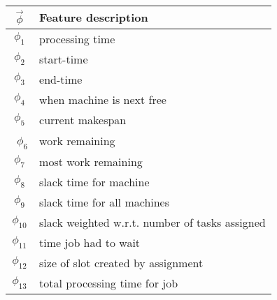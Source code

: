  {\footnotesize
 \begin{center}
  \begin{tabular}{|c|l|}
   \hline
  $\vec{\phi}$ & Feature description \\\hline
  $\phi_1$ & processing time \\
  $\phi_2$ & start-time \\
  $\phi_3$ & end-time \\
  $\phi_4$ & when machine is next free \\
  $\phi_5$ & current makespan \\\
  $\phi_6$ & work remaining \\
  $\phi_7$ & most work remaining \\
  $\phi_8$ & slack time for machine\\
  $\phi_9$ & slack time for all machines\\
  $\phi_{10}$ & slack weighted w.r.t. number of tasks assigned \\
  $\phi_{11}$ & time job had to wait \\
  $\phi_{12}$ & size of slot created by assignment\\
  $\phi_{13}$ & total processing time for job\\
   \hline
  \end{tabular}
 \end{center}}

